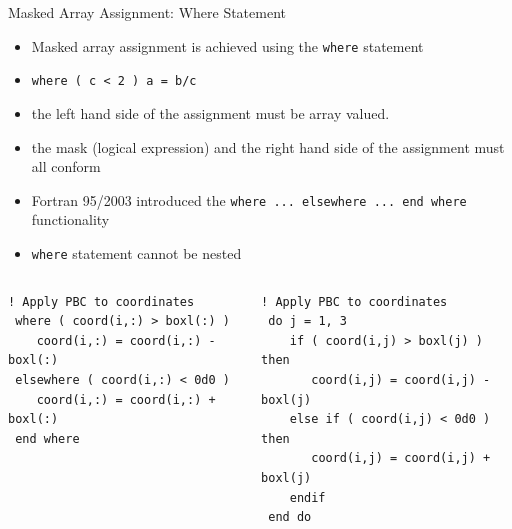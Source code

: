 \documentclass[c,mathserif,compress,xcolor=svgnames]{beamer}
\newcommand*\vardiamond{\textcolor{tigerspurple}{%
  \ensuremath{\blacklozenge}}}
\newcommand{\lstfortran}[1]{\lstinline[language={[90]Fortran},basicstyle=\footnotesize\ttfamily]|#1|}
\begin{document}
\begin{frame}[fragile]{Masked Array Assignment: Where Statement}
  \begin{itemize}
    \item Masked array assignment is achieved using the \lstfortran{where} statement
    \item[] \lstfortran{where ( c < 2 ) a = b/c }
    \item[] the left hand side of the assignment must be array valued.
    \item[] the mask (logical expression) and the right hand side of the assignment must all conform
    \item Fortran 95/2003 introduced the \lstfortran{where ... elsewhere ... end where} functionality
    \item \lstfortran{where} statement cannot be nested
  \end{itemize}
  \begin{columns}[t]
    \column{4.8cm}
    \begin{lstlisting}[language={[90]Fortran},basicstyle=\fontsize{6}{7}\selectfont\ttfamily]
 ! Apply PBC to coordinates
 where ( coord(i,:) > boxl(:) )
    coord(i,:) = coord(i,:) - boxl(:)
 elsewhere ( coord(i,:) < 0d0 )
    coord(i,:) = coord(i,:) + boxl(:)
 end where
    \end{lstlisting}
    \column{5.5cm}
    \begin{lstlisting}[language={[90]Fortran},basicstyle=\fontsize{6}{7}\selectfont\ttfamily]
 ! Apply PBC to coordinates
 do j = 1, 3
    if ( coord(i,j) > boxl(j) ) then
       coord(i,j) = coord(i,j) - boxl(j)
    else if ( coord(i,j) < 0d0 ) then
       coord(i,j) = coord(i,j) + boxl(j)
    endif
 end do
    \end{lstlisting}
  \end{columns}
\end{frame}

\end{document}
